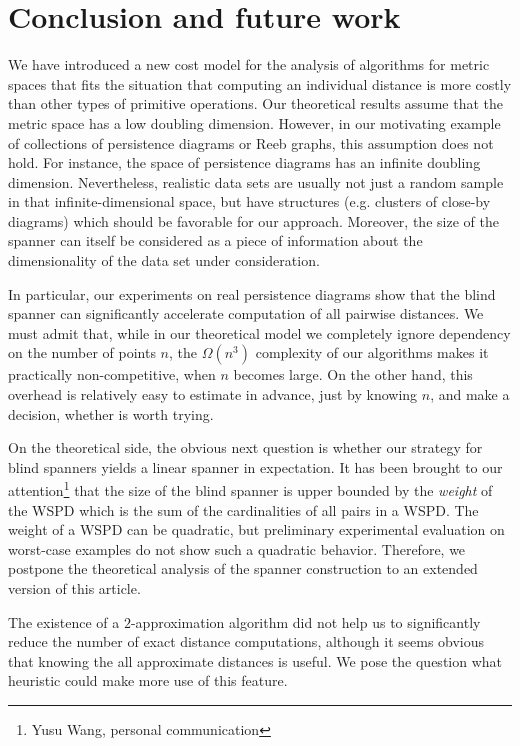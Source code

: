 \documentclass{ws-ijcga}
\begin{document}
\section{Conclusion and future work}
\label{sec:conclusion}
%
We have introduced a new cost model for the analysis of algorithms
for metric spaces that fits the situation that computing an individual distance
is more costly than other types of primitive operations.
Our theoretical results assume
that the metric space has a low doubling dimension.
However, in our motivating example of collections of persistence diagrams
or Reeb graphs, this assumption does not hold. For instance,
the space of persistence diagrams has an infinite doubling dimension.
Nevertheless, realistic data sets are usually not just a random sample
in that infinite-dimensional space, but have structures
(e.g. clusters of close-by diagrams) which should be favorable for our approach.
Moreover, the size of the \bgrdy spanner can itself be considered as a piece
of information about the dimensionality of the data set under consideration.


In particular, our experiments on real persistence diagrams
show that the blind spanner can significantly accelerate
computation of all pairwise distances. We must admit that,
while in our theoretical model we completely ignore dependency on the number of points $n$,
the $\Omega(n^3)$ complexity of our algorithms makes it practically
non-competitive, when $n$ becomes large.
On the other hand, this overhead is relatively easy to estimate
in advance, just by knowing $n$, and make a decision,
whether \bgrdy is worth trying. 


On the theoretical side, the obvious next question is whether our strategy
for blind spanners yields a linear spanner in expectation. 
It has been brought to our attention\footnote{Yusu Wang, personal communication}
that the size of the blind spanner is upper bounded by the \emph{weight} of the WSPD
which is the sum of the  cardinalities of all pairs in a WSPD.
The weight of a WSPD can be quadratic, but preliminary
experimental evaluation on worst-case examples do not show such a quadratic
behavior. Therefore, we postpone the theoretical analysis of the spanner construction
to an extended version of this article.

The existence of a $2$-approximation algorithm did not help us to significantly
reduce the number of exact distance computations, although it seems obvious
that knowing the all approximate distances is useful.
We pose the question what heuristic could make more use of this feature.
\end{document}

